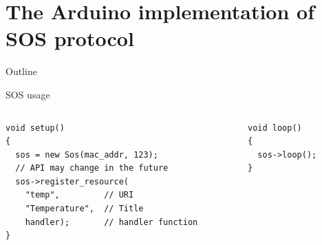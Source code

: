 \section {The Arduino implementation of SOS protocol}
\begin{frame} {Outline}
    \tableofcontents [current]
\end{frame}

\begin{frame}[containsverbatim]{SOS usage}
	\begin{columns}[c]
		\begin{column}[c]{.6\textwidth}
\begin{Verbatim}[fontsize=\scriptsize]
void setup() 
{
  sos = new Sos(mac_addr, 123);
  // API may change in the future
  sos->register_resource(
    "temp",         // URI
    "Temperature",  // Title
    handler);       // handler function
}
\end{Verbatim}
		\end{column}
		\begin{column}[c]{.4\textwidth}
\begin{Verbatim}[fontsize=\scriptsize]
void loop() 
{
  sos->loop();
}
\end{Verbatim}
		\end{column}
	\end{columns}
\end{frame}

